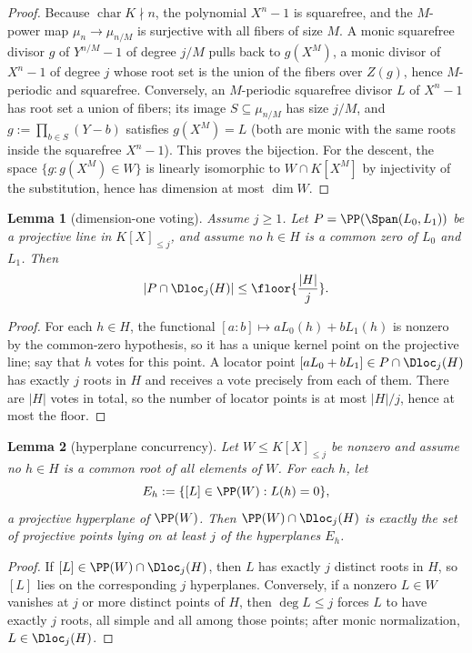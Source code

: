 \documentclass[11pt]{article}
\newtheorem{lemma}[lemma]{Lemma}
\theoremstyle{definition}
\theoremstyle{remark}
\begin{document}
\begin{proof}
Because $\operatorname{char}K\nmid n$, the polynomial $X^n-1$ is squarefree, and the $M$-power map $\mu_n\to\mu_{n/M}$ is surjective with all fibers of size $M$.  A monic squarefree divisor $g$ of $Y^{n/M}-1$ of degree $j/M$ pulls back to $g(X^M)$, a monic divisor of $X^n-1$ of degree $j$ whose root set is the union of the fibers over $Z(g)$, hence $M$-periodic and squarefree.  Conversely, an $M$-periodic squarefree divisor $L$ of $X^n-1$ has root set a union of fibers; its image $S\subseteq\mu_{n/M}$ has size $j/M$, and $g:=\prod_{b\in S}(Y-b)$ satisfies $g(X^M)=L$ \textup{(both are monic with the same roots inside the squarefree $X^n-1$)}.  This proves the bijection.  For the descent, the space $\{g:g(X^M)\in W\}$ is linearly isomorphic to $W\cap K[X^M]$ by injectivity of the substitution, hence has dimension at most $\dim W$.
\end{proof}

\begin{lemma}[dimension-one voting]\label{lem:capf-dim1}
Assume $j\ge1$.  Let $P=\PP(\Span(L_0,L_1))$ be a projective line in $K[X]_{\le j}$, and assume no $h\in H$ is a common zero of $L_0$ and $L_1$.  Then
\[
        |P\cap\Dloc_j(H)|\le\floor{\frac{|H|}{j}}.
\]
\end{lemma}

\begin{proof}
For each $h\in H$, the functional $[a:b]\mapsto aL_0(h)+bL_1(h)$ is nonzero by the common-zero hypothesis, so it has a unique kernel point on the projective line; say that $h$ votes for this point.  A locator point $[aL_0+bL_1]\in P\cap\Dloc_j(H)$ has exactly $j$ roots in $H$ and receives a vote precisely from each of them.  There are $|H|$ votes in total, so the number of locator points is at most $|H|/j$, hence at most the floor.
\end{proof}

\begin{lemma}[hyperplane concurrency]\label{lem:capf-concurrency}
Let $W\le K[X]_{\le j}$ be nonzero and assume no $h\in H$ is a common root of all elements of $W$.  For each $h$, let
\[
        E_h:=\{[L]\in\PP(W):L(h)=0\},
\]
a projective hyperplane of $\PP(W)$.  Then $\PP(W)\cap\Dloc_j(H)$ is exactly the set of projective points lying on at least $j$ of the hyperplanes $E_h$.
\end{lemma}

\begin{proof}
If $[L]\in\PP(W)\cap\Dloc_j(H)$, then $L$ has exactly $j$ distinct roots in $H$, so $[L]$ lies on the corresponding $j$ hyperplanes.  Conversely, if a nonzero $L\in W$ vanishes at $j$ or more distinct points of $H$, then $\deg L\le j$ forces $L$ to have exactly $j$ roots, all simple and all among those points; after monic normalization, $L\in\Dloc_j(H)$.
\end{proof}
\end{document}
